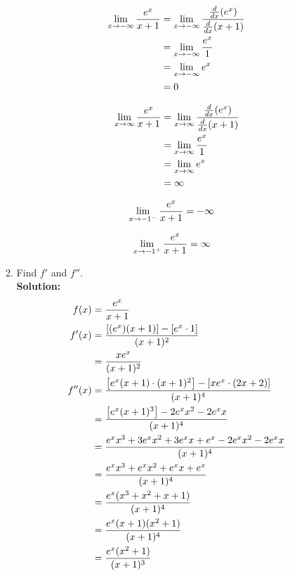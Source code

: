 \documentclass[a4paper]{article}
\begin{document}
\begin{enumerate}
\begin{enumerate}
\begin{align}
	\lim_{x \to -\infty} \frac{e^x}{x + 1} &= \lim_{x \to -\infty} \frac{\frac{d}{dx}(e^x)}{\frac{d}{dx}(x + 1)}\notag\\
	&= \lim_{x \to -\infty} \frac{e^x}{1}\notag\\
	&= \lim_{x \to -\infty} e^x \notag\\
	&= 0\notag
\end{align}

\begin{align}
	\lim_{x \to \infty} \frac{e^x}{x + 1} &= \lim_{x \to \infty} \frac{\frac{d}{dx}(e^x)}{\frac{d}{dx}(x + 1)}\notag\\
	&= \lim_{x \to \infty} \frac{e^x}{1}\notag\\
	&= \lim_{x \to \infty} e^x \notag\\
	&= \infty\notag
\end{align}

\begin{align}
	\lim_{x \to -1^{-}} \frac{e^x}{x + 1} &= - \infty\notag
\end{align}

\begin{align}
	\lim_{x \to -1^{+}} \frac{e^x}{x + 1} &= \infty\notag
\end{align}

\newpage

	\item Find $f'$ and $f''$.\\
	\textbf{Solution:}\\

\begin{align}
	f(x) &= \frac{e^x}{x + 1}\notag\\
	f'(x) &= \frac{\left[(e^x)(x+1)\right] - \left[ e^x \cdot 1\right]}{(x+1)^2}\notag\\
	&= \frac{xe^x}{(x+1)^2}\notag\\
	f''(x) &= \frac{\left[ e^x(x+1) \cdot (x+1)^2\right] - \left[ xe^x \cdot (2x + 2) \right]}{(x+1)^4}\notag\\
	&= \frac{\left[ e^x(x+1)^3\right] - 2e^xx^2 - 2e^xx}{(x+1)^4}\notag\\
	&= \frac{e^xx^3 + 3e^xx^2 + 3e^xx + e^x - 2e^xx^2 - 2e^xx }{(x+1)^4}\notag\\
	&= \frac{e^xx^3 + e^xx^2 + e^xx + e^x}{(x+1)^4}\notag\\
	&= \frac{e^x(x^3 + x^2 + x + 1)}{(x+1)^4}\notag\\
	&= \frac{e^x(x+1)(x^2+1)}{(x+1)^4}\notag\\
	&= \frac{e^x(x^2 + 1)}{(x+1)^3}\notag
\end{align}



\end{enumerate}
\end{enumerate}
\end{document}
